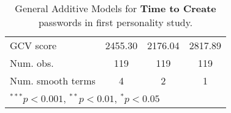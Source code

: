 {\begin{table}
\begin{center}
\begin{tabular}{l c c c }
	GCV score             & 2455.30        & 2176.04       & 2817.89        \\
	Num. obs.             & 119            & 119           & 119            \\
	Num. smooth terms     & 4              & 2             & 1              \\
	\hline
	\multicolumn{4}{l}{\scriptsize{$^{***}p<0.001$, $^{**}p<0.01$, $^*p<0.05$}}
\end{tabular}
\caption{General Additive Models for \textbf{Time to Create} passwords in first personality study.}
\label{tab:personality:study-1:timing-models}
\end{center}
\end{table}

}